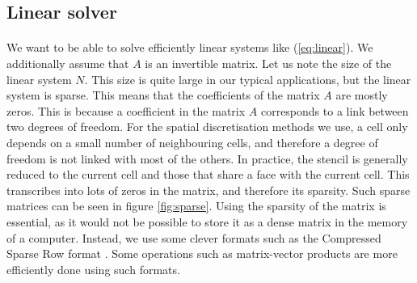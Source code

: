     \subsection{Linear solver}

      \paragraph{}
      We want to be able to solve efficiently linear systems like (\ref{eq:linear}).
      We additionally assume that $A$ is an invertible matrix.
      Let us note the size of the linear system $N$.
      This size is quite large in our typical applications, but the linear system is sparse.
      This means that the coefficients of the matrix $A$ are mostly zeros.
      This is because a coefficient in the matrix $A$ corresponds to a link between two degrees of freedom.
      For the spatial discretisation methods we use, a cell only depends on a small number of neighbouring cells, and therefore a degree of freedom is not linked with most of the others.
      In practice, the stencil is generally reduced to the current cell and those that share a face with the current cell.
      This transcribes into lots of zeros in the matrix, and therefore its sparsity.
      Such sparse matrices can be seen in figure \ref{fig:sparse}.
      Using the sparsity of the matrix is essential, as it would not be possible to store it as a dense matrix in the memory of a computer.
      Instead, we use some clever formats such as the Compressed Sparse Row format \cite{Saad2003}.
      Some operations such as matrix-vector products are more efficiently done using such formats.


